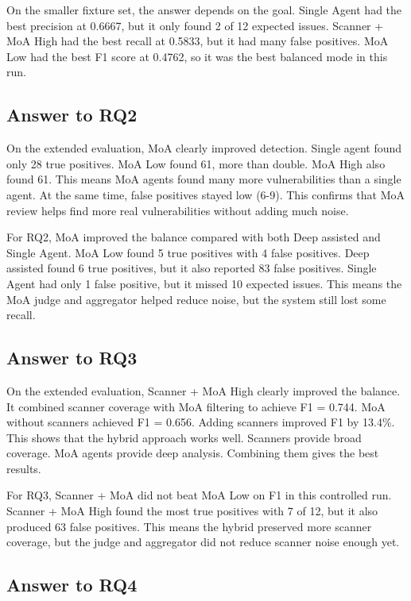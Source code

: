 \documentclass[sigconf,nonacm]{acmart}
\begin{document}
On the smaller fixture set, the answer depends on the goal. Single Agent had the best precision at 0.6667, but it only found 2 of 12 expected issues. Scanner + MoA High had the best recall at 0.5833, but it had many false positives. MoA Low had the best F1 score at 0.4762, so it was the best balanced mode in this run.

\subsection{Answer to RQ2}

On the extended evaluation, MoA clearly improved detection. Single agent found only 28 true positives. MoA Low found 61, more than double. MoA High also found 61. This means MoA agents found many more vulnerabilities than a single agent. At the same time, false positives stayed low (6-9). This confirms that MoA review helps find more real vulnerabilities without adding much noise.

For RQ2, MoA improved the balance compared with both Deep assisted and Single Agent. MoA Low found 5 true positives with 4 false positives. Deep assisted found 6 true positives, but it also reported 83 false positives. Single Agent had only 1 false positive, but it missed 10 expected issues. This means the MoA judge and aggregator helped reduce noise, but the system still lost some recall.

\subsection{Answer to RQ3}

On the extended evaluation, Scanner + MoA High clearly improved the balance. It combined scanner coverage with MoA filtering to achieve F1 = 0.744. MoA without scanners achieved F1 = 0.656. Adding scanners improved F1 by 13.4\%. This shows that the hybrid approach works well. Scanners provide broad coverage. MoA agents provide deep analysis. Combining them gives the best results.

For RQ3, Scanner + MoA did not beat MoA Low on F1 in this controlled run. Scanner + MoA High found the most true positives with 7 of 12, but it also produced 63 false positives. This means the hybrid preserved more scanner coverage, but the judge and aggregator did not reduce scanner noise enough yet.

\subsection{Answer to RQ4}
\end{document}
